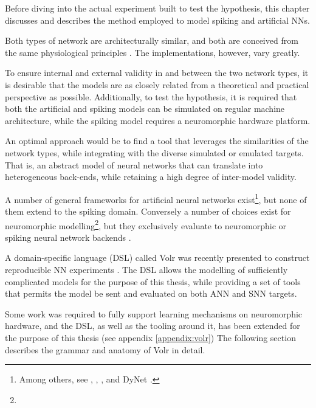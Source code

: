 
Before diving into the actual experiment built to test the hypothesis, this
chapter discusses and describes the method employed to model spiking
and artificial \gls{NN}s.

Both types of network are architecturally similar, and both are conceived from
the same physiological principles \autocite{dayan2001, russel2007, Nilsson2009, schmidhuber2014}.
The implementations, however, vary greatly.

To ensure internal and external validity in and between the two network types,
it is desirable that the models are as closely related from a theoretical and
practical perspective as possible.
Additionally, to test the hypothesis, it is required that both the artificial
and spiking models can be simulated on regular machine architecture, while
the spiking model requires a neuromorphic hardware platform.

An optimal approach would be to find a tool that leverages the similarities
of the network types, while integrating with the diverse simulated or emulated
targets.
That is, an abstract model of neural networks that can translate into
heterogeneous back-ends, while retaining a high degree of inter-model validity.

A number of general frameworks for artificial neural networks
exist\footnote{
  Among others, see \autocite{ONNX2018}, \autocite{PyTorch2018}, \autocite{TensorFlow2018},
  \autocite{Keras2018} and DyNet \autocite{Neubig2017}.
}, but none of them extend to the spiking domain.
Conversely a number of choices exist for neuromorphic modelling\footnote{
}, but they exclusively evaluate to neuromorphic or spiking neural network
backends \autocite{Jordan2018}.

A domain-specific language (DSL) called Volr was recently presented to
construct reproducible \gls{NN} experiments
\autocite{Pedersen2018:volr}.
The DSL allows the modelling of sufficiently complicated models for
the purpose of this thesis, while providing a set of tools that permits the
model be sent and evaluated on both \gls{ANN} and \gls{SNN} targets.

Some work was required to fully support learning mechanisms on
neuromorphic hardware, and the DSL, as well as the tooling around it, has been
extended for the purpose of this thesis (see appendix \ref{appendix:volr})
The following section describes the grammar and anatomy of Volr in detail.

